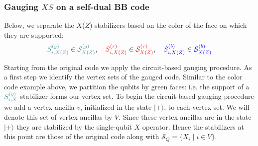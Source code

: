 \documentclass[11pt]{article}
\begin{document}
\subsubsection{Gauging \texorpdfstring{$XS$}{XS} on a self-dual BB code} 
Below, we separate the $X$($Z$) stabilizers based on the color of the face on which they are supported:
\begin{equation}
    \green{S^{(g)}_{i, X(Z)}} \in \green{\mathcal{S}^{(g)}_{X(Z)}}, \quad \red{S^{(r)}_{i, X(Z)}} \in \red{\mathcal{S}^{(r)}_{X(Z)}}, \quad \blue{S^{(b)}_{i,X(Z)}}\in \blue{\mathcal{S}^{(b)}_{X(Z)}}
\end{equation}


Starting from the original code we apply the circuit-based gauging procedure.  As a first step we identify the vertex sets of the gauged code. Similar to the color code example above, we partition the qubits by green faces: i.e. the support of a $\green{S^{(g)}_{i, X}}$ stabilizer forms our vertex set. To begin the circuit-based gauging procedure we add a vertex ancilla $v$, initialized in the state $|+\rangle$, to each vertex set. We will denote this set of vertex ancillas by $V$. Since these vertex ancillas are in the state $|+\rangle$ they are stabilized by the single-qubit $X$ operator.  Hence the stabilizers at this point are those of the original code along with $\mathcal{S}_Q = \{X_i \mid i \in V\}$.   
\end{document}
